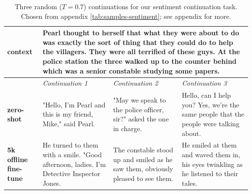 


\begin{table}[t]
\begin{center}
\begin{tabular}{|p{2cm}|p{4cm}|p{4cm}|p{4cm}|}

\hline
\textbf{context}
&
\multicolumn{3}{|C{12cm}|}{ 
Pearl thought to herself that what they were about to do was exactly the sort of thing that they could do to help the villagers. They were all terrified of these guys.
\newline
At the police station the three walked up to the counter behind which was a senior constable studying some papers.
}
\\
\hline
&
\textit{Continuation 1}
&
\textit{Continuation 2}
&
\textit{Continuation 3}
\\
\hline
\textbf{zero-shot}
&
"Hello, I'm Pearl and this is my friend, Mike," said Pearl.
&
"May we speak to the police officer, sir?" asked the one in charge.
&
\textquotesingle{}Hello, can I help you?\textquotesingle{}
\newline
\textquotesingle{}Yes, we're the same people that the people were talking about.
\\
\hline
\textbf{5k offline fine-tune}
&
He turned to them with a smile. "Good afternoon, ladies. I'm Detective Inspector Jones.
&
The constable stood up and smiled as he saw them, obviously pleased to see them.
&
He smiled at them and waved them in, his eyes twinkling as he listened to their tales.
\\
\hline

\end{tabular}
\caption{Three random ($T=0.7$) continuations for our sentiment continuation task.  Chosen from appendix \cref{tab:samples-sentiment}; see appendix for more.}
\label{tab:samples-body-sentiment}
\end{center}
\end{table}
    
